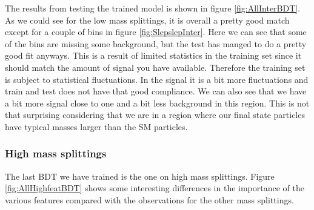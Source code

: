 The results from testing the trained model is shown in figure \ref{fig:AllInterBDT}. As we could see for the low mass splittings, it is overall a pretty good match except for a couple of bins in figure \ref{fig:SlepslepInter}. Here we can see that some of the bins are missing some background, but the test has manged to do a pretty good fit anyways. This is a result of limited statistics in the training set since it should match the amount of signal you have available. Therefore the training set is subject to statistical fluctuations. In the signal it is a bit more fluctuations and train and test does not have that good compliance. We can also see that we have a bit more signal close to one and a bit less background in this region. This is not that surprising considering that we are in a region where our final state particles have typical masses larger than the SM particles. 
















\subsubsection{High mass splittings}

The last BDT we have trained is the one on high mass splittings. Figure \ref{fig:AllHighfeatBDT} shows some interesting differences in the importance of the various features compared with the observations for the other mass splittings.

